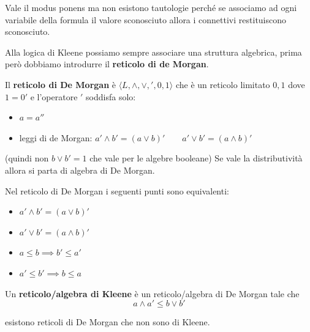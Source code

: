 Vale il modus ponens ma non esistono tautologie perché se associamo ad ogni variabile 
della formula il valore sconosciuto allora i connettivi restituiscono sconosciuto.

Alla logica di Kleene possiamo sempre associare una struttura algebrica, prima 
però dobbiamo introdurre il \textbf{reticolo di de Morgan}.

\begin{definizione}
    Il \textbf{reticolo di De Morgan} è $\langle L, \land, \lor,',0,1\rangle$ che è un reticolo limitato $0,1$
    dove $1=0'$ e l'operatore $'$ soddisfa solo:
    \begin{itemize}
        \item $a=a''$
        \item leggi di de Morgan: $a'\land b' = (a\lor b)'\qquad a'\lor b' = (a\land b)'$
    \end{itemize}
    (quindi non $b\lor b' = 1$ che vale per le algebre booleane)
    Se vale la distributività allora si parta di algebra di De Morgan.
\end{definizione}

\begin{nota}
    Nel reticolo di De Morgan i seguenti punti sono equivalenti:
    \begin{itemize}
        \item $a'\land b' = (a\lor b)'$
        \item $a'\lor b'= (a \land b)'$
        \item $a\le b \implies b'\le a'$
        \item $a'\le b' \implies b\le a$
    \end{itemize}
\end{nota}

\begin{definizione}
    Un \textbf{reticolo/algebra di Kleene} è un reticolo/algebra di De Morgan tale che 
    $$a\land a' \le b\lor b'$$
\end{definizione}
\begin{esempio}
    esistono reticoli di De Morgan che non sono di Kleene.
\end{esempio}

